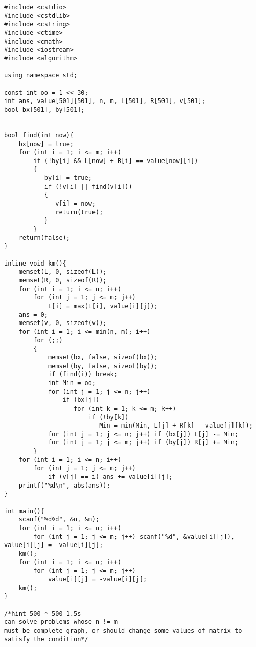 \begin{lstlisting}
#include <cstdio>
#include <cstdlib>
#include <cstring>
#include <ctime>
#include <cmath>
#include <iostream>
#include <algorithm>

using namespace std;

const int oo = 1 << 30;
int ans, value[501][501], n, m, L[501], R[501], v[501];
bool bx[501], by[501];


bool find(int now){
    bx[now] = true;
    for (int i = 1; i <= m; i++)
        if (!by[i] && L[now] + R[i] == value[now][i])
        {
           by[i] = true;
           if (!v[i] || find(v[i]))
           {
              v[i] = now;
              return(true);
           }
        }
    return(false);
}

inline void km(){
    memset(L, 0, sizeof(L));
    memset(R, 0, sizeof(R));
    for (int i = 1; i <= n; i++)
        for (int j = 1; j <= m; j++)
            L[i] = max(L[i], value[i][j]);
    ans = 0;
    memset(v, 0, sizeof(v));
    for (int i = 1; i <= min(n, m); i++) 
        for (;;)
        {
            memset(bx, false, sizeof(bx));
            memset(by, false, sizeof(by));
            if (find(i)) break;
            int Min = oo;
            for (int j = 1; j <= n; j++) 
                if (bx[j]) 
                   for (int k = 1; k <= m; k++)
                       if (!by[k]) 
                          Min = min(Min, L[j] + R[k] - value[j][k]);
            for (int j = 1; j <= n; j++) if (bx[j]) L[j] -= Min;
            for (int j = 1; j <= m; j++) if (by[j]) R[j] += Min;
        }
    for (int i = 1; i <= n; i++)
        for (int j = 1; j <= m; j++)
            if (v[j] == i) ans += value[i][j];
    printf("%d\n", abs(ans));
}

int main(){
    scanf("%d%d", &n, &m);
    for (int i = 1; i <= n; i++) 
        for (int j = 1; j <= m; j++) scanf("%d", &value[i][j]), value[i][j] = -value[i][j]; 
    km();
    for (int i = 1; i <= n; i++) 
        for (int j = 1; j <= m; j++) 
            value[i][j] = -value[i][j];
    km();
}

/*hint 500 * 500 1.5s
can solve problems whose n != m 
must be complete graph, or should change some values of matrix to satisfy the condition*/
\end{lstlisting}
